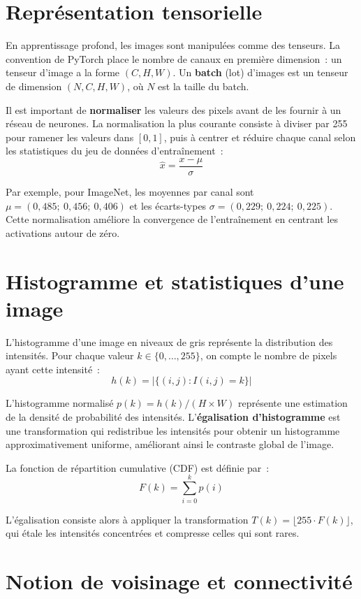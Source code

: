 \documentclass[a4paper,11pt,twoside]{book}
\begin{document}
\section{Représentation tensorielle}

En apprentissage profond, les images sont manipulées comme des tenseurs. La convention de PyTorch place le nombre de canaux en première dimension~: un tenseur d'image a la forme $(C, H, W)$. Un \textbf{batch} (lot) d'images est un tenseur de dimension $(N, C, H, W)$, où $N$ est la taille du batch.

Il est important de \textbf{normaliser} les valeurs des pixels avant de les fournir à un réseau de neurones. La normalisation la plus courante consiste à diviser par 255 pour ramener les valeurs dans $[0, 1]$, puis à centrer et réduire chaque canal selon les statistiques du jeu de données d'entraînement~:
\[
\hat{x} = \frac{x - \mu}{\sigma}
\]

Par exemple, pour ImageNet, les moyennes par canal sont $\mu = (0{,}485;\ 0{,}456;\ 0{,}406)$ et les écarts-types $\sigma = (0{,}229;\ 0{,}224;\ 0{,}225)$. Cette normalisation améliore la convergence de l'entraînement en centrant les activations autour de zéro.

\section{Histogramme et statistiques d'une image}

L'histogramme d'une image en niveaux de gris représente la distribution des intensités. Pour chaque valeur $k \in \{0, \ldots, 255\}$, on compte le nombre de pixels ayant cette intensité~:
\[
h(k) = \big|\{(i,j) : I(i,j) = k\}\big|
\]

L'histogramme normalisé $p(k) = h(k) / (H \times W)$ représente une estimation de la densité de probabilité des intensités. L'\textbf{égalisation d'histogramme} est une transformation qui redistribue les intensités pour obtenir un histogramme approximativement uniforme, améliorant ainsi le contraste global de l'image.

La fonction de répartition cumulative (CDF) est définie par~:
\[
F(k) = \sum_{i=0}^{k} p(i)
\]

L'égalisation consiste alors à appliquer la transformation $T(k) = \lfloor 255 \cdot F(k) \rfloor$, qui étale les intensités concentrées et compresse celles qui sont rares.

\section{Notion de voisinage et connectivité}
\end{document}
